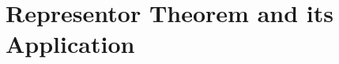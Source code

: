 \documentclass[a4paper,12pt]{article}
\begin{document}
\section{Representor Theorem and its Application}
\end{document}
